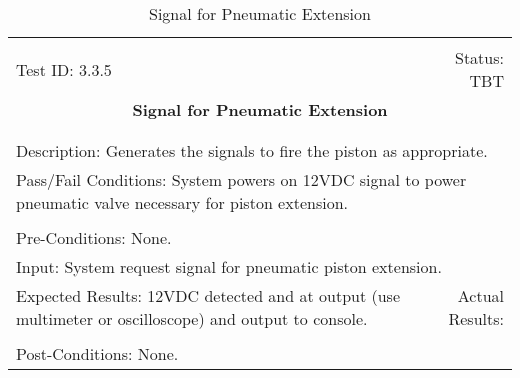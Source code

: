 \documentclass[titlepage]{article}
\begin{document}
\begin{center}%
\begin{table}[h!]
\begin{tabular}{|l r|}\hline&\\[-2mm]
	Test ID: 3.3.5	&Status: TBT\\[-3mm]
	\multicolumn{2}{|c|}{\textbf{\large{Signal for Pneumatic Extension}}}\\&\\\hline&\\[-3mm]
	\multicolumn{2}{|p{\textwidth}|}{Description: Generates the signals to fire the piston as appropriate.}\\\hline
	\multicolumn{2}{|p{\textwidth}|}{Pass/Fail Conditions: System powers on 12VDC signal to power pneumatic valve necessary for piston extension.}\\[1mm]\hline&\\[-3mm]
	\multicolumn{2}{|p{\textwidth}|}{Pre-Conditions: None.}\\[4mm]
	\multicolumn{2}{|p{\textwidth}|}{Input: System request signal for pneumatic piston extension.}\\[2mm]\hline
	\multicolumn{1}{|p{0.49\textwidth}}{Expected Results: 12VDC detected and at output (use multimeter or oscilloscope) and output to console.}	&\multicolumn{1}{|p{0.45\textwidth}|}{Actual Results: }\\\hline&\\[-3mm]
	\multicolumn{2}{|p{\textwidth}|}{Post-Conditions: None.}\\\hline
\end{tabular}
\caption{Signal for Pneumatic Extension}
\end{table}
\end{center}
\newpage
\end{document}
